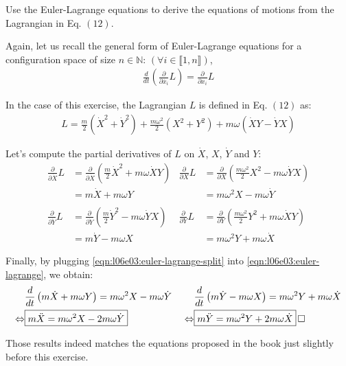 \documentclass[solutions.tex]{subfiles}
\begin{document}
\maketitle
\begin{exercise}
Use the Euler-Lagrange equations to derive the equations of motions
from the Lagrangian in Eq. $(12)$.
\end{exercise}
Again, let us recall the general form of Euler-Lagrange equations
for a configuration space of size $n\in\mathbb{N}$: $(\forall i \in\llbracket 1, n\rrbracket)$,
\begin{align}
	\frac{d}{dt}\left(\frac{\partial}{\partial\dot{x_i}}L\right)
		= \frac{\partial}{\partial x_i}L
	\label{eqn:l06e03:euler-lagrange}
\end{align}

In the case of this exercise, the Lagrangian $L$ is defined in Eq. $(12)$ as:
\begin{align}
	L = \frac{m}{2}(\dot{X}^2+\dot{Y}^2)
	  + \frac{m\omega^2}{2}(X^2+Y^2)
	  + m\omega(\dot{X}Y-\dot{Y}X) \nonumber
\end{align}

Let's compute the partial derivatives of $L$ on $\dot{X}$, $X$, $\dot{Y}$ and $Y$:
\begin{align}
	\frac{\partial}{\partial\dot{X}}L &=
		\frac{\partial}{\partial\dot{X}}
			\left(\frac{m}{2}\dot{X}^2 + m\omega\dot{X}Y\right)
	& \frac{\partial}{\partial X}L &=
		\frac{\partial}{\partial X}
			\left(\frac{m\omega^2}{2}X^2 - m\omega\dot{Y}X\right)
		\nonumber \\
	~ &= m\dot{X} + m\omega Y & ~ &= m\omega^2 X - m\omega\dot{Y} \nonumber\\
	~ & ~ & ~ & \nonumber \\
	\frac{\partial}{\partial\dot{Y}}L &=
		\frac{\partial}{\partial\dot{Y}}
			\left(\frac{m}{2}\dot{Y}^2 - m\omega\dot{Y}X\right)
	& \frac{\partial}{\partial Y}L &=
		\frac{\partial}{\partial Y}
			\left(\frac{m\omega^2}{2}Y^2 + m\omega\dot{X}Y\right)
		\nonumber \\
	~ &= m\dot{Y} - m\omega X & ~ &= m\omega^2 Y + m\omega\dot{X}
	\label{eqn:l06e03:euler-lagrange-split}
\end{align}

Finally, by plugging \eqref{eqn:l06e03:euler-lagrange-split} into
\eqref{eqn:l06e03:euler-lagrange}, we obtain:
\begin{align*}
	~ & \frac{d}{dt}\left(m\dot{X} + m\omega Y\right) = m\omega^2 X - m\omega\dot{Y}
	& ~ & \frac{d}{dt}\left(m\dot{Y} - m\omega X\right) = m\omega^2 Y + m\omega\dot{X}\\
	\Leftrightarrow & \boxed{m\ddot{X} = m\omega^2X-2m\omega\dot{Y}}
	& ~ \Leftrightarrow & \boxed{m\ddot{Y} = m\omega^2Y+2m\omega\dot{X}} \qed
\end{align*}
\begin{remark} Those results indeed matches the equations proposed
in the book just slightly before this exercise.
\end{remark}
\end{document}
